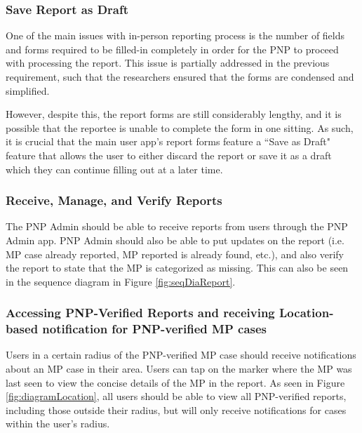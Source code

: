 \subsubsection{Save Report as Draft}
One of the main issues with in-person reporting  process is the number of fields and forms required to be filled-in completely in order for the PNP to proceed with processing the report. This issue is partially addressed  in the previous requirement, such that the researchers ensured that the forms are condensed and simplified. 

However, despite this, the report forms are still considerably lengthy, and it is possible that the reportee is unable to complete the form in one sitting. As such, it is crucial that the main user app's report forms feature a ``Save as Draft" feature that allows the user to either discard the report or save it as a draft which they can continue filling out at a later time.  

\subsubsection{Receive, Manage, and Verify Reports}

The PNP Admin should be able to receive reports from users through the PNP Admin app. PNP Admin should also be able to put updates on the report (i.e. MP case already reported, MP reported is already found, etc.), and also verify the report to state that the MP is categorized as missing. This can also be seen in the sequence diagram in Figure \ref{fig:seqDiaReport}. 

\subsubsection{Accessing PNP-Verified Reports and receiving Location-based notification for PNP-verified MP cases}

Users in a certain radius of the PNP-verified MP case  should receive notifications about an MP case in their area. Users can tap on the marker where the MP was last seen to view the concise details of the MP in the report. As seen in Figure \ref{fig:diagramLocation}, all users should be able to view all PNP-verified reports, including those outside their radius, but will only receive notifications for cases within the user's radius.

